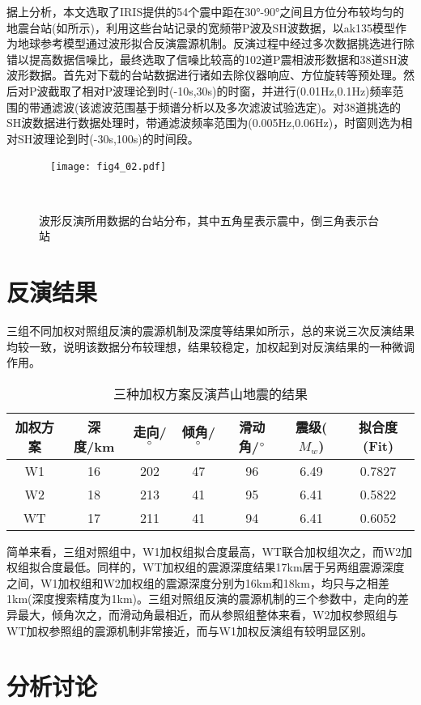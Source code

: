 据上分析，本文选取了IRIS提供的54个震中距在30°-90°之间且方位分布较均匀的地震台站(如所示)，利用这些台站记录的宽频带P波及SH波数据，以ak135模型\citep{Kennett1995}作为地球参考模型通过波形拟合反演震源机制。反演过程中经过多次数据挑选进行除错以提高数据信噪比，最终选取了信噪比较高的102道P震相波形数据和38道SH波波形数据。首先对下载的台站数据进行诸如去除仪器响应、方位旋转等预处理。然后对P波截取了相对P波理论到时(-10s,30s)的时窗，并进行(0.01Hz,0.1Hz)频率范围的带通滤波(该滤波范围基于频谱分析以及多次滤波试验选定)。对38道挑选的SH波数据进行数据处理时，带通滤波频率范围为(0.005Hz,0.06Hz)，时窗则选为相对SH波理论到时(-30s,100s)的时间段。
\begin{figure}
\centering
  \texttt{[image: fig4\_02.pdf]}
  \caption{波形反演所用数据的台站分布，其中五角星表示震中，倒三角表示台站}
  \label{fig4_02}
\end{figure}

\section{反演结果}
三组不同加权对照组反演的震源机制及深度等结果如所示，总的来说三次反演结果均较一致，说明该数据分布较理想，结果较稳定，加权起到对反演结果的一种微调作用。
\begin{table}[ht]
\centering
\caption{三种加权方案反演芦山地震的结果}
\label{tab4_01}
    \begin{tabular}{c c c c c c c}
    \hline
    加权方案 & 深度/km  & 走向/$^\circ$ & 倾角/$^\circ$ & 滑动角/$^\circ$ & 震级($M_w$) & 拟合度(Fit) \\
    \hline
    W1		& 16  & 202 & 47 & 96 & 6.49 & 0.7827 \\
    W2		& 18  & 213 & 41 & 95 & 6.41 & 0.5822 \\
    WT		& 17  & 211 & 41 & 94 & 6.41 & 0.6052 \\
    \hline
    \end{tabular}
\end{table}

简单来看，三组对照组中，W1加权组拟合度最高，WT联合加权组次之，而W2加权组拟合度最低。同样的，WT加权组的震源深度结果17km居于另两组震源深度之间，W1加权组和W2加权组的震源深度分别为16km和18km，均只与之相差1km(深度搜索精度为1km)。三组对照组反演的震源机制的三个参数中，走向的差异最大，倾角次之，而滑动角最相近，而从参照组整体来看，W2加权参照组与WT加权参照组的震源机制非常接近，而与W1加权反演组有较明显区别。

\section{分析讨论}
